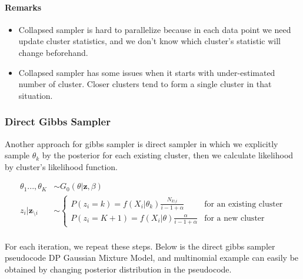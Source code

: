 \documentclass[a4paper]{article}
\begin{document}
\paragraph{Remarks}

\begin{itemize}
\item
  Collapsed sampler is hard to parallelize because in each data point we
  need update cluster statistics, and we don't know which cluster's
  statistic will change beforehand.
\item
  Collapsed sampler has some issues when it starts with under-estimated
  number of cluster. Closer clusters tend to form a single cluster in
  that situation.
\end{itemize}


\subsubsection{Direct Gibbs Sampler}

Another approach for gibbs sampler is direct sampler in which we
explicitly sample \(\theta_k\) by the posterior for each existing
cluster, then we calculate likelihood by cluster's likelihood function.

\begin{align*}
\theta_1...,\theta_K&\sim G_0(\theta|\boldsymbol z, \beta) \\
z_i|\boldsymbol z_{\setminus i} &\sim \begin{cases}
P(z_i=k)= f(X_i|\theta_{k})\frac{N_{k\setminus i}}{i-1+\alpha} & \text{for an existing cluster} \\
P(z_i=K+1)= f(X_i|\theta)\frac{\alpha}{i-1+\alpha} & \text{for a new cluster}
\end{cases}\\
\end{align*}

For each iteration, we repeat these steps. Below is the direct gibbs
sampler pseudocode DP Gaussian Mixture Model, and multinomial example
can easily be obtained by changing posterior distribution in the
pseudocode.
\end{document}
